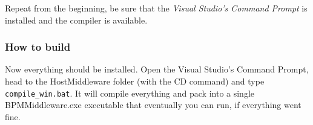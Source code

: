 Repeat from the beginning, be sure that the \textit{Visual Studio's Command Prompt} is installed and the compiler is available. 

\subsubsection{How to build}
Now everything should be installed. Open the Visual Studio's Command Prompt, head to the HostMiddleware folder (with the CD command) and type \texttt{compile\_win.bat}. It will compile everything and pack into a single BPMMiddleware.exe executable that eventually you can run, if everything went fine.

